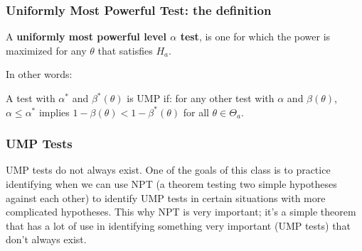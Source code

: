 \documentclass{beamer}
\begin{document}
\begin{frame}
\frametitle{Uniformly Most Powerful Test: the definition}

A \textbf{uniformly most powerful level $\alpha$ test}, is one for which the power is maximized for any $\theta$ that satisfies $H_a$.
\newline

In other words:
\begin{theorem}
A test with $\alpha^*$ and $\beta^*(\theta)$ is UMP if: for any other test with $\alpha$ and $\beta(\theta)$, $\alpha \le \alpha^*$ implies $1 - \beta(\theta) < 1-\beta^*(\theta)$ for all $\theta \in \Theta_a$.
\end{theorem}





\end{frame}


\begin{frame}
\frametitle{UMP Tests}

UMP tests do not always exist. One of the goals of this class is to practice identifying when we can use NPT (a theorem testing two simple hypotheses against each other) to identify UMP tests in certain situations with more complicated hypotheses. This why NPT is very important; it's a simple theorem that has a lot of use in identifying something very important (UMP tests) that don't always exist. 

\end{frame}
\end{document}

